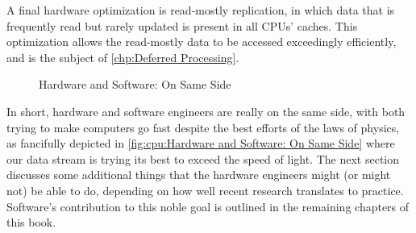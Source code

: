A final hardware optimization is read-mostly replication, in which
data that is frequently read but rarely updated is present in all
CPUs' caches.
This optimization allows the read-mostly data to be accessed
exceedingly efficiently, and is the subject of
\cref{chp:Deferred Processing}.

\begin{figure}
\centering
{}
\caption{Hardware and Software:
				On Same Side}
\end{figure}

In short, hardware and software engineers are really on the same side,
with both trying to make computers go fast despite the best efforts of
the laws of physics, as fancifully depicted in
\cref{fig:cpu:Hardware and Software: On Same Side}
where our data stream is trying its best to exceed the speed of light.
The next section discusses some additional things that the hardware engineers
might (or might not) be able to do, depending on how well recent
research translates to practice.
Software's contribution to this noble goal is outlined in the remaining
chapters of this book.
